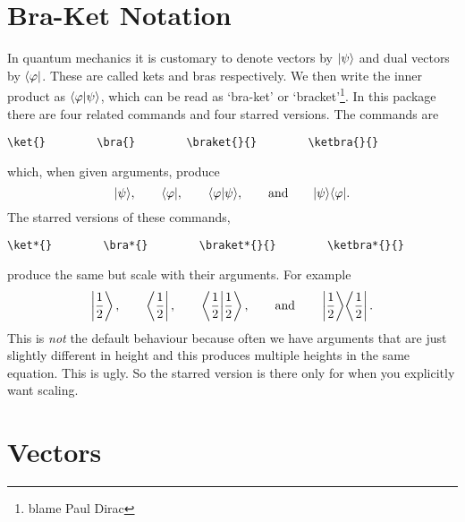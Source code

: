 \documentclass[fleqn, a4paper, openany]{memoir}
\begin{document}
    \section{Bra-Ket Notation}
    In quantum mechanics it is customary to denote vectors by \(\ket{\psi}\) and dual vectors by \(\bra{\varphi}\).
    These are called kets and bras respectively.
    We then write the inner product as \(\braket{\varphi}{\psi}\), which can be read as `bra-ket' or `bracket'\footnote{blame Paul Dirac}.
    In this package there are four related commands and four starred versions.
    The commands are
    \begin{Verbatim}[gobble=2]
        \ket{}        \bra{}        \braket{}{}        \ketbra{}{}
    \end{Verbatim}
    which, when given arguments, produce
    \begin{equation}
        \ket{\psi}, \qquad \bra{\varphi}, \qquad \braket{\varphi}{\psi}, \qquad\text{and}\qquad \ketbra{\psi}{\varphi}.
    \end{equation}
    The starred versions of these commands,
    \begin{Verbatim}[gobble=2]
        \ket*{}        \bra*{}        \braket*{}{}        \ketbra*{}{}
    \end{Verbatim}
    produce the same but scale with their arguments.
    For example
    \begin{equation}
        \ket*{\frac{1}{2}}, \qquad \bra*{\frac{1}{2}}, \qquad \braket*{\frac{1}{2}}{\frac{1}{2}}, \qquad\text{and}\qquad \ketbra*{\frac{1}{2}}{\frac{1}{2}}.
    \end{equation}
    This is \emph{not} the default behaviour because often we have arguments that are just slightly different in height and this produces multiple heights in the same equation.
    This is ugly.
    So the starred version is there only for when you explicitly want scaling.
    
    \section{Vectors}
\end{document}

